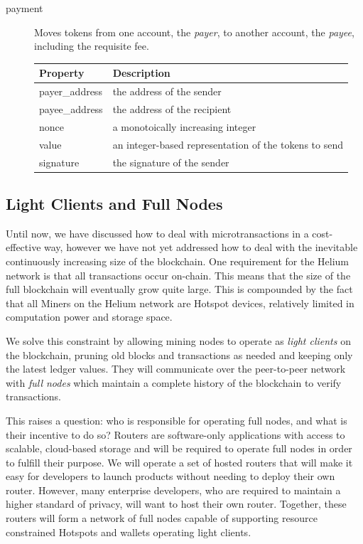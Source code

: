 \documentclass[10pt, nonatbib, nocopyrightspace, reprint]{sigplanconf}
\begin{document}
\begin{description}
\item [payment] \label{payment} Moves tokens from one account, the \emph{payer}, to another account, the \emph{payee}, including the requisite fee.

\begin{table}[H]
  \centering
  \begin{tabularx}{\columnwidth}{l X}
      \toprule
      Property & Description \\ \midrule
      payer\_address & the address of the sender \\
      payee\_address & the address of the recipient \\
      nonce & a monotoically increasing integer \\
      value & an integer-based representation of the tokens to send \\
      signature & the signature of the sender
  \end{tabularx}
\end{table}

\end{description}

\subsection{Light Clients and Full Nodes} \label{full-nodes}

Until now, we have discussed how to deal with microtransactions in a cost-effective way, however we have not yet addressed how to deal with the inevitable continuously increasing size of the blockchain. One requirement for the Helium network is that all transactions occur on-chain. This means that the size of the full blockchain will eventually grow quite large. This is compounded by the fact that all Miners on the Helium network are Hotspot devices, relatively limited in computation power and storage space.

We solve this constraint by allowing mining nodes to operate as \emph{light clients} on the blockchain, pruning old blocks and transactions as needed and keeping only the latest ledger values. They will communicate over the peer-to-peer network with \emph{full nodes} which maintain a complete history of the blockchain to verify transactions.

This raises a question: who is responsible for operating full nodes, and what is their incentive to do so? Routers are software-only applications with access to scalable, cloud-based storage and will be required to operate full nodes in order to fulfill their purpose. We will operate a set of hosted routers that will make it easy for developers to launch products without needing to deploy their own router. However, many enterprise developers, who are required to maintain a higher standard of privacy, will want to host their own router. Together, these routers will form a network of full nodes capable of supporting resource constrained Hotspots and wallets operating light clients.
\end{document}
